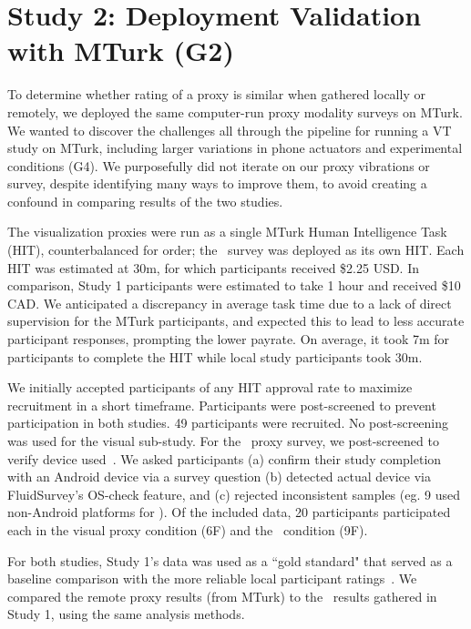 \section{Study 2: Deployment Validation with MTurk (G2)}
To determine whether rating of a proxy is similar when gathered locally or remotely, we deployed the same computer-run proxy modality surveys on MTurk.
We wanted to discover the challenges all through the pipeline for running a VT study on MTurk, including larger variations in phone actuators and experimental conditions (G4). 
We purposefully did not iterate on our proxy vibrations or survey, despite identifying many ways to improve them, to avoid creating a confound in comparing results of the two studies. 

The visualization proxies were run as a single MTurk Human Intelligence Task (HIT), counterbalanced for order; the \lofi\ survey was deployed as its own HIT.
Each HIT was estimated at 30m, for which participants received \$2.25 USD. In comparison, Study 1 participants were estimated to take 1 hour and received \$10 CAD. 
We anticipated a discrepancy in average task time due to a lack of direct supervision for the MTurk participants, and expected this to lead to less accurate participant responses, prompting the lower payrate.
On average, it took 7m for participants to complete the HIT while local study participants took 30m.

We initially accepted participants of any HIT approval rate to maximize recruitment in a short timeframe. Participants were post-screened to prevent participation in both studies. 49 participants were recruited. 
%
No post-screening was used for the visual sub-study.
For the \lofi~proxy survey, we post-screened
to verify device used~\cite{behavioralturk}. 
We asked participants (a) confirm their study completion with an Android device via a survey question (b) detected actual device via FluidSurvey's OS-check feature, and (c) rejected inconsistent samples (eg. 9 used non-Android platforms for \lofi). 
Of the included data, 20 participants participated each in the visual proxy condition (6F) and the \lofi~condition (9F).

For both studies, Study 1's data was used as a ``gold standard" that served as a baseline comparison with the more reliable local participant ratings~\cite{Amazon.comInc.2015}.
%
We compared the remote proxy results (from MTurk) to the \hifi~results gathered in Study 1, using the same analysis methods.

